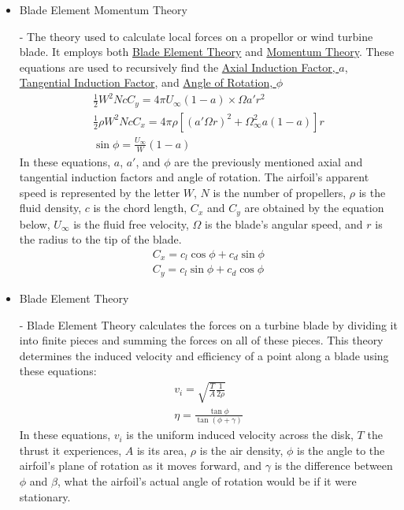 \documentclass{article}
\begin{document}
\begin{itemize}
	\item \hypertarget{BEM}{Blade Element Momentum Theory} - The theory used to calculate local forces on a propellor or wind turbine blade. It employs both \hyperlink{BET}{Blade Element Theory} and \hyperlink{MT}{Momentum Theory}. These equations are used to recursively find the \hyperlink{a}{Axial Induction Factor, $a$}, \hyperlink{a'}{Tangential Induction Factor}, and \hyperlink{phi}{Angle of Rotation, $\phi$}
	\begin{equation}
	\begin{aligned}
		\frac{1}{2} W^{2} N c C_{y} = 4 \pi U_{\infty} (1 - a) \times \Omega a' r^{2} \\
		\frac{1}{2} \rho W^{2} N c C_{x} = 4 \pi \rho [(a' \Omega r)^{2} + \Omega^{2}_{\infty} a (1 - a)] r \\
		\sin \phi = \frac{U_{\infty}}{W} (1 - a)
	\end{aligned}
	\end{equation}
In these equations, $a$, $a'$, and $\phi$ are the previously mentioned axial and tangential induction factors and angle of rotation. The airfoil's apparent speed is represented by the letter $W$, $N$ is the number of propellers, $\rho$ is the fluid density, $c$ is the chord length, $C_{x}$ and $C_{y}$ are obtained by the equation below, $U_{\infty}$ is the fluid free velocity, $\Omega$ is the blade's angular speed, and $r$ is the radius to the tip of the blade.
	\begin{equation}
	\begin{aligned}
		C_{x} = c_{l} \cos{\phi} + c_{d} \sin{\phi} \\
		C_{y} = c_{l} \sin{\phi} + c_{d} \cos{\phi}
	\end{aligned}
	\end{equation}
	
	\item \hypertarget{BET}{Blade Element Theory} - Blade Element Theory calculates the forces on a turbine blade by dividing it into finite pieces and summing the forces on all of these pieces. This theory determines the induced velocity and efficiency of a point along a blade using these equations:
	\begin{equation}
	\begin{aligned}
		v_{i} = \sqrt{\frac{T}{A} \frac{1}{2 \rho}} \\
        		\eta = \frac{\tan{\phi}}{\tan{(\phi + \gamma)}}
	\end{aligned}
	\end{equation}
In these equations, $v_{i}$ is the uniform induced velocity across the disk, $T$ the thrust it experiences, $A$ is its area, $\rho$ is the air density, $\phi$ is the angle to the airfoil's plane of rotation as it moves forward, and $\gamma$ is the difference between $\phi$ and $\beta$, what the airfoil's actual angle of rotation would be if it were stationary.


\end{itemize}
\end{document}
